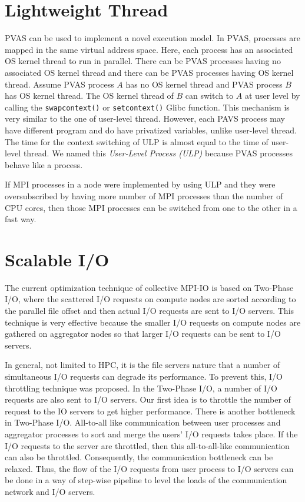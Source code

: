 \section{Lightweight Thread}

PVAS can be used to implement a novel execution model. In PVAS,
processes are mapped in the same virtual address space. Here, each
process has an associated OS kernel thread to run in parallel. There
can be PVAS processes having no associated OS kernel thread and there
can be PVAS processes having OS kernel thread. Assume PVAS process $A$
has no OS kernel thread and PVAS process $B$ has OS kernel thread. The
OS kernel thread of $B$ can switch to $A$ at user level by calling
the {\tt swapcontext()} or {\tt setcontext()} Glibc function. This
mechanism is very similar to the one of user-level thread. However,
each PAVS process may have different program and do have privatized
variables, unlike user-level thread. The time for the context
switching of ULP is almost equal to the time of user-level thread. 
We named this {\em User-Level Process (ULP)}
because PVAS processes behave like a process\cite{110009850784}.

If MPI processes in a node were implemented by using ULP and they were
oversubscribed by having more number of MPI processes than the number
of CPU cores, then those MPI processes can be switched from one to
the other in a fast way. 

\section{Scalable I/O}

The current optimization technique of collective MPI-IO\cite{romio} is
based on Two-Phase I/O\cite{two-phase}, where the scattered I/O
requests on compute nodes are 
sorted according to the parallel file offset and then actual I/O
requests are sent to I/O servers. This technique is very effective
because the smaller I/O requests on compute nodes are gathered on
aggregator nodes so that larger I/O requests can be sent to I/O
servers. 

In general, not limited to HPC, it is the file servers nature that a
number of simultaneous I/O requests can degrade its performance. To
prevent this, I/O throttling technique was proposed. In the Two-Phase
I/O, a number of I/O requests are also sent to I/O servers. Our first
idea is to throttle the number of request to the IO servers to get
higher performance. There is another bottleneck in Two-Phase
I/O. All-to-all like communication between user processes and
aggregator processes to sort and merge the users' I/O requests takes
place. If the I/O requests to the server are throttled, then this
all-to-all-like communication can also be throttled. Consequently, the
communication bottleneck can be relaxed. Thus, the flow  
of the I/O requests from user process to I/O servers can be done in a
way of step-wise pipeline to level the loads of the communication
network and I/O servers.

